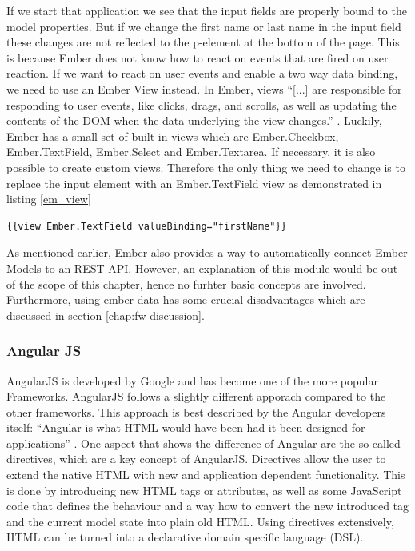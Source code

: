 If we start that application we see that the input fields are properly bound to the model properties.
But if we change the first name or last name in the input field these changes are not reflected to the p-element at the bottom of the page.
This is because Ember does not know how to react on events that are fired on user reaction.
If we want to react on user events and enable a two way data binding,  we need to use an Ember View instead. In Ember, views
\enquote{[...] are responsible for responding to user events, like clicks, drags, and scrolls, as well as updating the contents of the DOM when the data underlying the view changes.} \autocite{tech-ana:em-views}.
Luckily, Ember has a small set of built in views which are Ember.Checkbox, Ember.TextField, Ember.Select and Ember.Textarea.
If necessary, it is also possible to create custom views.
Therefore the only thing we need to change is to replace the input element with an Ember.TextField view as demonstrated in listing \ref{em_view}

\begin{lstlisting}[label=em_view,caption=Ember Views]
	{{view Ember.TextField valueBinding="firstName"}}
\end{lstlisting}

As mentioned earlier, Ember also provides a way to automatically connect Ember Models to an REST API. However, an explanation of this module would be out of the scope of this chapter, hence no furhter basic concepts are involved. Furthermore, using ember data has some crucial disadvantages which are discussed in section \ref{chap:fw-discussion}.

\subsubsection{Angular JS}  

AngularJS is developed by Google and has become one of the more popular Frameworks.
AngularJS follows a slightly different apporach compared to the other frameworks.
This approach is best described by the Angular developers itself: \enquote{Angular is what HTML would have been had it been designed for applications} \autocite{tech-ana:ng-intro}.
One aspect that shows the difference of Angular are the so called directives, which are a key concept of AngularJS.
Directives allow the user to extend the native HTML with new and application dependent functionality.
This is done by introducing new HTML tags or attributes, as well as some JavaScript code that defines the behaviour and a way how to convert the new introduced tag and the current model state into plain old HTML. Using directives extensively, HTML can be turned into a declarative domain specific language (DSL).

